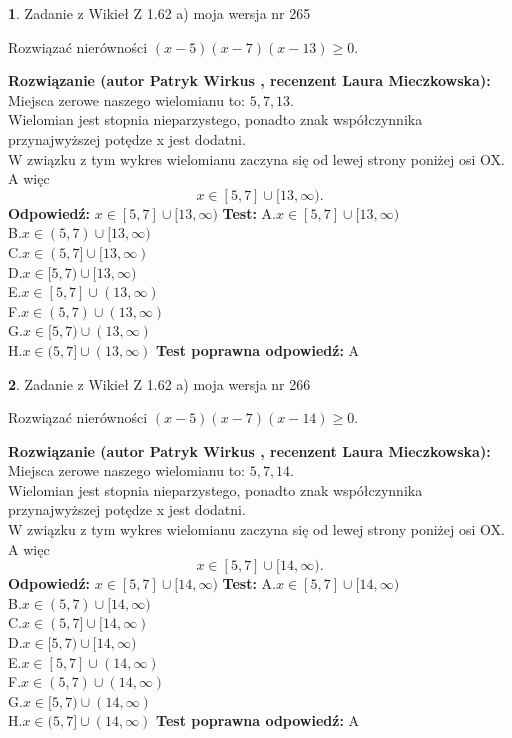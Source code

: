 \documentclass[12pt, a4paper]{article}
\theoremstyle{definition} %
\newtheorem{zad}{}
\newcommand{\zadStart}[1]{\begin{zad}#1\newline}
\newcommand{\zadStop}{\end{zad}}
\newcommand{\rozwStart}[2]{\noindent \textbf{Rozwiązanie (autor #1 , recenzent #2): }\newline}
\newcommand{\rozwStop}{\newline}
\newcommand{\odpStart}{\noindent \textbf{Odpowiedź:}\newline}
\newcommand{\odpStop}{\newline}
\newcommand{\testStart}{\noindent \textbf{Test:}\newline}
\newcommand{\testStop}{\newline}
\newcommand{\kluczStart}{\noindent \textbf{Test poprawna odpowiedź:}\newline}
\newcommand{\kluczStop}{\newline}
\begin{document}
\zadStart{Zadanie z Wikieł Z 1.62 a) moja wersja nr 265}

Rozwiązać nierówności $(x-5)(x-7)(x-13)\ge0$.
\zadStop
\rozwStart{Patryk Wirkus}{Laura Mieczkowska}
Miejsca zerowe naszego wielomianu to: $5, 7, 13$.\\
Wielomian jest stopnia nieparzystego, ponadto znak współczynnika przy\linebreak najwyższej potędze x jest dodatni.\\ W związku z tym wykres wielomianu zaczyna się od lewej strony poniżej osi OX. A więc $$x \in [5,7] \cup [13,\infty).$$
\rozwStop
\odpStart
$x \in [5,7] \cup [13,\infty)$
\odpStop
\testStart
A.$x \in [5,7] \cup [13,\infty)$\\
B.$x \in (5,7) \cup [13,\infty)$\\
C.$x \in (5,7] \cup [13,\infty)$\\
D.$x \in [5,7) \cup [13,\infty)$\\
E.$x \in [5,7] \cup (13,\infty)$\\
F.$x \in (5,7) \cup (13,\infty)$\\
G.$x \in [5,7) \cup (13,\infty)$\\
H.$x \in (5,7] \cup (13,\infty)$
\testStop
\kluczStart
A
\kluczStop



\zadStart{Zadanie z Wikieł Z 1.62 a) moja wersja nr 266}

Rozwiązać nierówności $(x-5)(x-7)(x-14)\ge0$.
\zadStop
\rozwStart{Patryk Wirkus}{Laura Mieczkowska}
Miejsca zerowe naszego wielomianu to: $5, 7, 14$.\\
Wielomian jest stopnia nieparzystego, ponadto znak współczynnika przy\linebreak najwyższej potędze x jest dodatni.\\ W związku z tym wykres wielomianu zaczyna się od lewej strony poniżej osi OX. A więc $$x \in [5,7] \cup [14,\infty).$$
\rozwStop
\odpStart
$x \in [5,7] \cup [14,\infty)$
\odpStop
\testStart
A.$x \in [5,7] \cup [14,\infty)$\\
B.$x \in (5,7) \cup [14,\infty)$\\
C.$x \in (5,7] \cup [14,\infty)$\\
D.$x \in [5,7) \cup [14,\infty)$\\
E.$x \in [5,7] \cup (14,\infty)$\\
F.$x \in (5,7) \cup (14,\infty)$\\
G.$x \in [5,7) \cup (14,\infty)$\\
H.$x \in (5,7] \cup (14,\infty)$
\testStop
\kluczStart
A
\kluczStop
\end{document}
